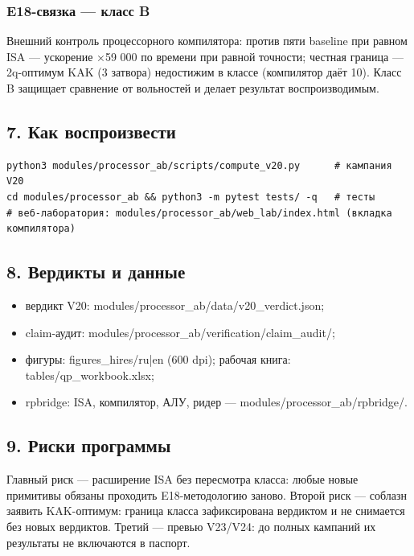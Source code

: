 \documentclass[11pt,a4paper]{article}
\begin{document}
\subsubsection{E18-связка — класс B}

Внешний контроль процессорного компилятора: против пяти baseline при равном ISA — ускорение ×59 000 по времени при равной точности; честная граница — 2q-оптимум KAK (3 затвора) недостижим в классе (компилятор даёт 10). Класс B защищает сравнение от вольностей и делает результат воспроизводимым.

\subsection{7. Как воспроизвести}

\begin{verbatim}
python3 modules/processor_ab/scripts/compute_v20.py      # кампания V20
cd modules/processor_ab && python3 -m pytest tests/ -q   # тесты
# веб-лаборатория: modules/processor_ab/web_lab/index.html (вкладка компилятора)
\end{verbatim}

\subsection{8. Вердикты и данные}

\begin{itemize}
  \item вердикт V20: modules/processor\_ab/data/v20\_verdict.json;
  \item claim-аудит: modules/processor\_ab/verification/claim\_audit/;
  \item фигуры: figures\_hires/ru|en (600 dpi); рабочая книга: tables/qp\_workbook.xlsx;
  \item rpbridge: ISA, компилятор, АЛУ, ридер — modules/processor\_ab/rpbridge/.
\end{itemize}

\subsection{9. Риски программы}

Главный риск — расширение ISA без пересмотра класса: любые новые примитивы обязаны проходить E18-методологию заново. Второй риск — соблазн заявить KAK-оптимум: граница класса зафиксирована вердиктом и не снимается без новых вердиктов. Третий — превью V23/V24: до полных кампаний их результаты не включаются в паспорт.
\end{document}
